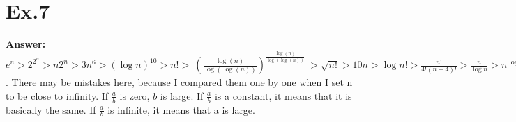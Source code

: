 \documentclass{article}
\begin{document}
\section*{Ex.7}
    \textbf{Answer:} $e^n>2^{2^n}>n2^n>3n^6>\left(\log n\right)^{10}>n!>\:\left(\frac{\log \left(n\right)}{\log \left(\log \left(n\right)\right)}\right)^{\frac{\log \left(n\right)}{\log \left(\log \left(n\right)\right)}}\:>\sqrt{n!}>10n>\log n!>\frac{n!}{4!\left(n-4\right)!}>\frac{n}{\log n}>n^{\log \left(\log \left(n\right)\right)}>\frac{n^2}{\left(\log n\right)^{10}}>\log n^3>\frac{\log n}{n}$. There may be mistakes here, because I compared them one by one when I set n to be close to infinity. If $\frac{a}{b}$ is zero, $b$ is large. If $\frac{a}{b}$ is a constant, it means that it is basically the same. If $\frac{a}{b}$ is infinite, it means that a is large.
\end{document}

